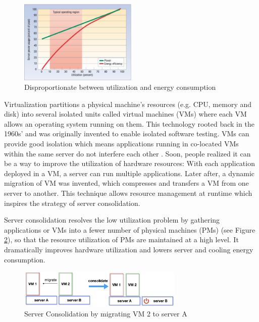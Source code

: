 \begin{figure}
	\centering
	\includegraphics[width=0.5\textwidth]{pics/util.png}
	\caption{Disproportionate between utilization and energy consumption \cite{Barroso:2007jt}}
	\label{fig:unproportional}
\end{figure} 

Virtualization \cite{Uhlig:2005do} partitions a physical machine's resources (e.g. CPU, memory and disk) into several isolated units called virtual machines (VMs) where each VM allows an operating system running on them. This technology rooted back in the 1960s' and was originally invented to enable isolated software testing. VMs can provide good isolation which means applications running in co-located VMs within the same server do not interfere each other \cite{Somani:2009ho}.  Soon, people realized it can be a way to improve the utilization of hardware resources: With each application deployed in a VM, a server can run multiple applications. Later after, a dynamic migration of VM was invented, which compresses and transfers a VM from one server to another. This technique allows resource management at runtime which inspires the strategy of server consolidation. 



Server consolidation \cite{Zhang:2010vo} resolves the low utilization problem by gathering applications or VMs into a fewer number of physical machines (PMs) (see Figure \ref{fig:unproportional}), so that the resource utilization of PMs are maintained at a high level. It dramatically improves hardware utilization and lowers server and cooling energy consumption. 

\begin{figure}
	\centering
	\includegraphics[width=0.7\textwidth]{pics/consolidate.png}
	\caption{Server Consolidation by migrating VM 2 to server A \cite{Barroso:2007jt}}
	\label{fig:unproportional}
\end{figure} 

